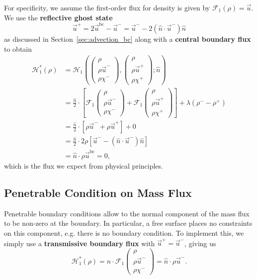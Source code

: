 \documentclass{report}
\numberwithin{equation}{section}
\begin{document}
For specificity, we assume the first-order flux for density is given by $\mathcal{F}_1(\rho) = \vec u$. 
We use the \textbf{reflective ghost state}
\begin{equation}
    \vec u^+ = 2 \vec u^{\text{bc}} - \vec u^- = \vec u^- - 2 \left(\hat n \cdot \vec u^-\right) \hat n
\end{equation}
as discussed in Section~\ref{sec:advection_bc} along with a \textbf{central boundary flux} to obtain
\begin{align}
    \mathcal{H}_1^*(\rho) & = \mathcal{H}_1\left(
        \begin{pmatrix} \rho \\ \rho \vec u^- \\ \rho \chi^- \end{pmatrix},
        \begin{pmatrix} \rho \\ \rho \vec u^+ \\ \rho \chi^+ \end{pmatrix}; 
    \hat n \right) \nonumber \\
    & = \frac{\hat n}{2} \cdot \left[
        \mathcal{F}_1\begin{pmatrix} \rho \\ \rho \vec u^- \\ \rho \chi^- \end{pmatrix} 
        + \mathcal{F}_1\begin{pmatrix} \rho \\ \rho \vec u^+ \\ \rho \chi^+ \end{pmatrix} 
    \right] + \lambda (\rho^- - \rho^+) \nonumber \\
    & = \frac{\hat n}{2} \cdot \left[\rho \vec u^- + \rho \vec u^+ \right] + 0 \\
    & = \frac{\hat n}{2} \cdot 2 \rho \left[\vec u^- - \left(\hat n \cdot \vec u^-\right) \hat n \right ] \nonumber \\
    & = \hat n \cdot \rho \vec u^{\text{bc}} = 0 \nonumber,
\end{align}
which is the flux we expect from physical principles.

\subsection{Penetrable Condition on Mass Flux}

Penetrable boundary conditions allow to the normal component of the mass flux to be non-zero at the boundary. In particular, a free surface places no constraints on this component, e.g. there is no boundary condition. To implement this, we simply use a \textbf{transmissive boundary flux} with $\vec u^+ = \vec u^-$, giving us
\begin{equation}
    \mathcal{H}_1^*(\rho) = \hat n \cdot \mathcal{F}_1\begin{pmatrix} \rho \\ \rho \vec u^- \\ \rho \chi^- \end{pmatrix} = \hat n \cdot \rho \vec u^-.
\end{equation}
\end{document}
